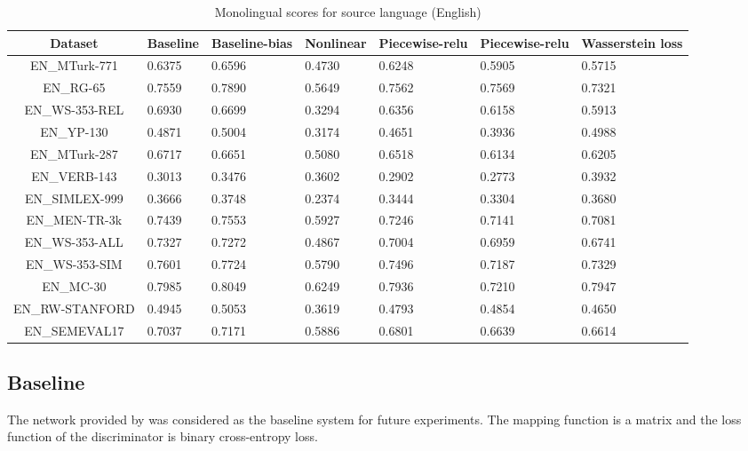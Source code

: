 \documentclass[11pt]{article}
\begin{document}
\begin{table*}[ht]
  \begin{center}
  \begin{tabular}{|c|l|l|l|l|l|l|}
  \hline
  Dataset & Baseline & Baseline-bias & Nonlinear & Piecewise-relu & Piecewise-relu & Wasserstein loss\\
  \hline
  EN\_MTurk-771 & 0.6375 & 0.6596 & 0.4730 & 0.6248 & 0.5905 & 0.5715 \\
  \hline
  EN\_RG-65 & 0.7559 & 0.7890 & 0.5649 & 0.7562 & 0.7569 & 0.7321 \\
  \hline
  EN\_WS-353-REL & 0.6930 & 0.6699 & 0.3294 & 0.6356 & 0.6158 & 0.5913 \\
  \hline
  EN\_YP-130 & 0.4871 & 0.5004 & 0.3174 & 0.4651 & 0.3936 & 0.4988 \\
  \hline
  EN\_MTurk-287 & 0.6717 & 0.6651 & 0.5080 & 0.6518 & 0.6134 & 0.6205 \\
  \hline
  EN\_VERB-143 & 0.3013 & 0.3476 & 0.3602 & 0.2902 & 0.2773 & 0.3932 \\
  \hline
  EN\_SIMLEX-999 & 0.3666 & 0.3748 & 0.2374 & 0.3444 & 0.3304 & 0.3680 \\
  \hline
  EN\_MEN-TR-3k & 0.7439 & 0.7553 & 0.5927 & 0.7246 & 0.7141 & 0.7081 \\
  \hline
  EN\_WS-353-ALL & 0.7327 & 0.7272 & 0.4867 & 0.7004 & 0.6959 & 0.6741 \\
  \hline
  EN\_WS-353-SIM & 0.7601 & 0.7724 & 0.5790 & 0.7496 & 0.7187 & 0.7329 \\
  \hline
  EN\_MC-30 & 0.7985 & 0.8049 & 0.6249 & 0.7936 & 0.7210 & 0.7947 \\
  \hline
  EN\_RW-STANFORD & 0.4945 & 0.5053 & 0.3619 & 0.4793 & 0.4854 & 0.4650 \\
  \hline
  EN\_SEMEVAL17 & 0.7037 & 0.7171 & 0.5886 & 0.6801 & 0.6639 & 0.6614 \\
  \hline
  \end{tabular}
  \end{center}
  \caption{ Monolingual scores for source language (English)}
  \label{monolingual-source}
\end{table*}

\subsection{Baseline} \label{baseline}
The network provided by \cite{muserepo} was considered as the baseline system for future experiments. The mapping function is a matrix and the loss function of the discriminator is binary cross-entropy loss.
\end{document}
